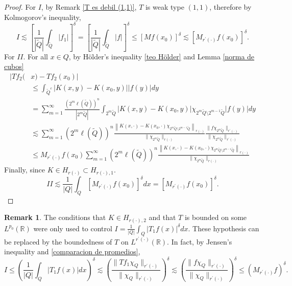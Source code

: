 \documentclass[a4paper,11pt,reqno]{amsart}
\theoremstyle{plain}
\numberwithin{equation}{section}
\theoremstyle{definition}
\newtheorem{remark}[teo]{Remark}
\begin{document}
\begin{proof}
	For $I$,  by Remark \ref{T es debil (1,1)}, $T$ is weak type $(1,1)$, therefore by Kolmogorov’s inequality, 
	\begin{equation*}
	I\lesssim\left[\frac{1}{|{\tilde{Q}}|}\int_{{\tilde{Q}}}|f_1|\right]^\delta=\left[\frac{1}{|{\tilde{Q}}|}\int_{{\tilde{Q}}}|f|\right]^\delta\leq \left[Mf(x_0)\right]^\delta\lesssim\left[M_{{r^\prime(\cdot)}}f(x_0)\right]^\delta.
	\end{equation*}
	For $II$. For all $x\in Q$, by Hölder's inequality \ref{teo Hölder} and Lemma \ref{norma de cubos}
	\begin{align*}
	|Tf_2(&x)-Tf_2(x_0)|\\
	&\leq \int_{{\tilde{Q}}^c}\left|K(x,y)-K(x_0,y)\right||f(y)|dy\\
	&=\sum_{m=1}^{\infty}\frac{\left(2^m\ell({\tilde{Q}})\right)^n}{|2^m{\tilde{Q}}|}\int_{2^m{\tilde{Q}}}\left|K(x,y)-K(x_0,y)\right|\chi_{2^m{\tilde{Q}}\setminus2^{m-1}{\tilde{Q}}}|f(y)|dy\\	
	&\lesssim\sum_{m=1}^{\infty}\left(2^m\ell({\tilde{Q}})\right)^n\frac{\left\|K(x,\cdot)-K(x_0,\cdot)\chi_{2^m{\tilde{Q}}\setminus2^{m-1}{\tilde{Q}}}\right\|_{r(\cdot)}}{\|\chi_{2^m{\tilde{Q}}}\|_{r(\cdot)}}\frac{\|f\chi_{2^m{\tilde{Q}}}\|_{r^\prime(\cdot)}}{\|\chi_{2^m{\tilde{Q}}}\|_{r^\prime(\cdot)}}\\
	&\leq M_{r^\prime(\cdot)} f(x_0)\sum_{m=1}^{\infty}\left(2^m\ell({\tilde{Q}})\right)^n\frac{\left\|K(x,\cdot)-K(x_0,\cdot)\chi_{2^m{\tilde{Q}}\setminus2^{m-1}{\tilde{Q}}}\right\|_{r(\cdot)}}{\|\chi_{2^m{\tilde{Q}}}\|_{r(\cdot)}}
	\end{align*}
	Finally, since $K\in H_{r(\cdot)}\subset H_{{r(\cdot)},1}$.
	\begin{equation*}
	II\lesssim\frac{1}{|Q|}\int_{Q}\left[M_{r^\prime(\cdot)} f(x_0)\right]^\delta dx=\left[M_{r^\prime(\cdot)} f(x_0)\right]^\delta.
	\end{equation*}
\end{proof}
\begin{remark}\label{cambio de hipo}
	The conditions that $K \in H_{r(\cdot),2}$ and that $T$ is bounded on some $L^{p_0}(\mathbb{R})$ were only used to control $I = \frac{1}{|Q|}\int_Q |T_1 f(x)|^\delta dx$. These hypothesis can be replaced by the boundedness of $T$ on $L^{r^\prime(\cdot)}(\mathbb{R})$. In fact, by Jensen's inequality and \eqref{comparacion de promedios},
	\begin{equation*}
		I\leq \left(\frac{1}{|Q|}\int_Q |T_1 f(x)|  dx\right)^\delta\lesssim \left(\frac{\|Tf_1\chi_Q\|_{r^\prime(\cdot)}}{\|\chi_Q\|_{r^\prime(\cdot)}}\right)^\delta\lesssim  \left( \frac{\|f\chi_Q\|_{r^\prime(\cdot)}}{\|\chi_Q\|_{r^\prime(\cdot)}} \right)^\delta\leq \left(M_{r^\prime(\cdot)} f\right)^\delta.
	\end{equation*}
	
\end{remark}
\end{document}
